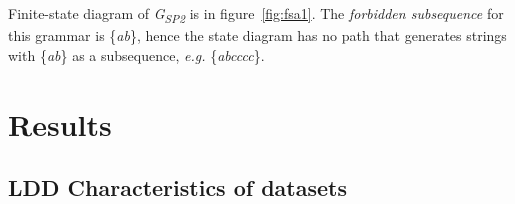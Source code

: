 \documentclass[a0,portrait]{a0poster}
\begin{document}
\begin{multicols}{2}
Finite-state diagram of \emph{G\textsubscript{SP2}} is in figure~\ref{fig:fsa1}. The \emph{forbidden subsequence} for this grammar is \{\emph{ab}\}, hence the state diagram has no path that generates strings with \{\emph{ab}\} as a subsequence, \emph{e.g.} \{\emph{abcccc}\}.


\section*{Results}

\subsection*{LDD Characteristics of datasets}


\end{multicols}
\end{document}
